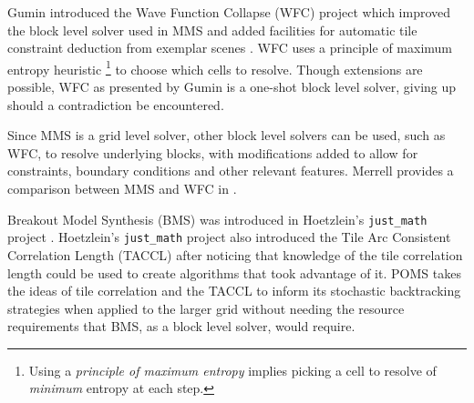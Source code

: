 
Gumin introduced the Wave Function Collapse (WFC) project which improved the block level solver used in MMS
and added facilities for automatic tile constraint deduction from exemplar scenes \cite{Gumin_2016}.
WFC uses a principle of maximum entropy heuristic \footnote{Using a \textit{principle of maximum entropy} implies picking a cell to resolve of \textit{minimum} entropy at each step.}
to choose which cells to resolve.
Though extensions are possible, WFC as presented by Gumin is a one-shot block level solver, giving up should a contradiction be encountered.

Since MMS is a grid level solver, other block level solvers can be used, such as WFC, to resolve underlying blocks,
with modifications added to allow for constraints, boundary conditions and other relevant features.
Merrell provides a comparison between MMS and WFC in \cite{Merrell_comparison_2021}.

Breakout Model Synthesis (BMS) was introduced in Hoetzlein's \texttt{just\_math} project \cite{Hoetzlein_2023}.
Hoetzlein's \texttt{just\_math} project also introduced
the Tile Arc Consistent Correlation Length (TACCL) after noticing that knowledge of the tile correlation length could be
used to create algorithms that took advantage of it.
POMS takes the ideas of tile correlation and the TACCL to inform its stochastic backtracking strategies when applied to the larger grid
without needing the resource requirements that BMS, as a block level solver, would require.

